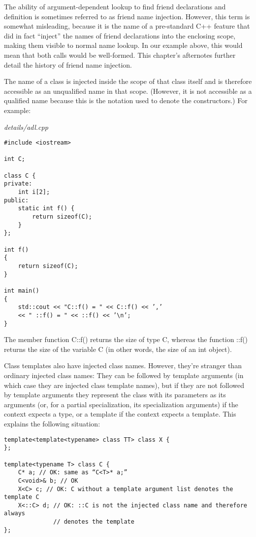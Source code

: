The ability of argument-dependent lookup to find friend declarations and definition is sometimes referred to as friend name injection. However, this term is somewhat misleading, because it is the name of a pre-standard C++ feature that did in fact “inject” the names of friend declarations into the enclosing scope, making them visible to normal name lookup. In our example above, this would mean that both calls would be well-formed. This chapter’s afternotes further detail the history of friend name injection.


The name of a class is injected inside the scope of that class itself and is therefore accessible as an unqualified name in that scope. (However, it is not accessible as a qualified name because this is the notation used to denote the constructors.) For example:

\noindent
\textit{details/adl.cpp}
\begin{lstlisting}[style=styleCXX]
#include <iostream>

int C;

class C {
private:
	int i[2];
public:
	static int f() {
		return sizeof(C);
	}
};

int f()
{
	return sizeof(C);
}

int main()
{
	std::cout << "C::f() = " << C::f() << ’,’
	<< " ::f() = " << ::f() << ’\n’;
}
\end{lstlisting}

The member function C::f() returns the size of type C, whereas the function ::f() returns the size of the variable C (in other words, the size of an int object).

Class templates also have injected class names. However, they’re stranger than ordinary injected class names: They can be followed by template arguments (in which case they are injected class template names), but if they are not followed by template arguments they represent the class with its parameters as its arguments (or, for a partial specialization, its specialization arguments) if the context expects a type, or a template if the context expects a template. This explains the following situation:

\begin{lstlisting}[style=styleCXX]
template<template<typename> class TT> class X {
};

template<typename T> class C {
	C* a; // OK: same as “C<T>* a;”
	C<void>& b; // OK
	X<C> c; // OK: C without a template argument list denotes the template C
	X<::C> d; // OK: ::C is not the injected class name and therefore always
			  // denotes the template
};
\end{lstlisting}

